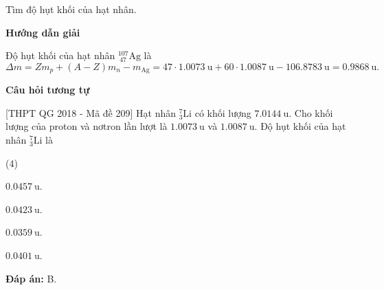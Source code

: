 \begin{dang}{Tìm độ hụt khối của hạt nhân.}

	
	{\begin{center}
		\textbf{Hướng dẫn giải}
	\end{center}
	
	Độ hụt khối của hạt nhân $^{107}_{\ 47}\text{Ag}$ là 
	\begin{equation*}
	\Delta m = Z m_p+ (A-Z) m_n - m_\text{Ag} = 47\cdot \SI{1,0073}{\atomicmassunit} + 60 \cdot \SI{1,0087}{\atomicmassunit} - \SI{106,8783}{\atomicmassunit} = \SI{0,9868}{\atomicmassunit}.
	\end{equation*}
	
	\begin{center}
		\textbf{Câu hỏi tương tự}
	\end{center}
	
	[THPT QG 2018 - Mã đề 209] Hạt nhân $^7_3\text{Li}$ có khối lượng $\SI{7,0144}{\atomicmassunit}$. Cho khối lượng của proton và nơtron lần lượt là $\SI{1,0073}{\atomicmassunit}$ và $\SI{1,0087}{\atomicmassunit}$. Độ hụt khối của hạt nhân $^7_3\text{Li}$ là
	\begin{mcq}(4)
		\item $\SI{0,0457}{\atomicmassunit}$.
		\item $\SI{0,0423}{\atomicmassunit}$.
		\item $\SI{0,0359}{\atomicmassunit}$.
		\item $\SI{0,0401}{\atomicmassunit}$.
	\end{mcq}

	\textbf{Đáp án:} B.}
	

\end{dang}
